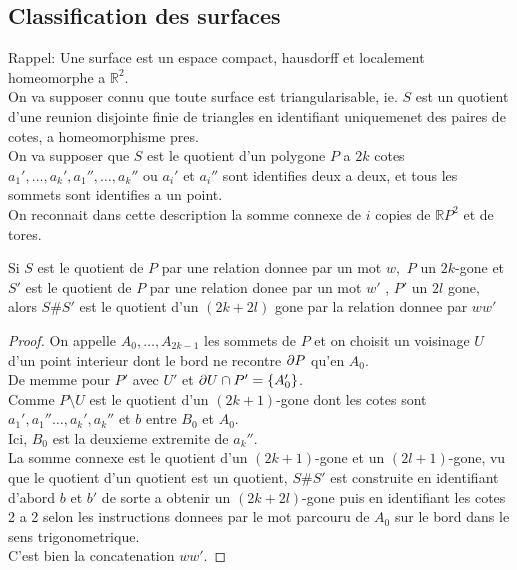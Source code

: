\documentclass[../main.tex]{subfiles}
\begin{document}
\subsection{Classification des surfaces}
Rappel: Une surface est un espace compact, hausdorff et localement homeomorphe a $ \mathbb{R}^{2}$.\\
On va supposer connu que toute surface est triangularisable, ie. $S$ est un quotient d'une reunion disjointe finie de triangles en identifiant uniquemenet des paires de cotes, a homeomorphisme pres.\\
On va supposer que $S$ est le quotient d'un polygone $P$ a $2k$ cotes $ a_1',\ldots,a_k', a_1'', \ldots, a_k''$ ou $a_i'$ et $a_i''$ sont identifies deux a deux, et tous les sommets sont identifies a un point.\\
On reconnait dans cette description la somme connexe de $i$ copies de $ \mathbb{R}P^{2}$ et de tores.
\begin{propo}
Si $S$ est le quotient de $P$ par une relation donnee par un  mot $w,$ $P$ un $2k$-gone et $S'$ est le quotient de $P$ par une relation donee par un mot $ w'$ , $ P'$ un $2l$ gone, alors $S\# S'$ est le quotient d'un $( 2k+2l) $ gone par la relation donnee par $ww'$
\end{propo}
\begin{proof}
On appelle $A_0, \ldots, A_{2k-1} $ les sommets de $P$ et on choisit un voisinage $U$  d'un point interieur dont le bord ne recontre $\partial P$ qu'en $A_0$.\\
De memme pour $P'$ avec $U'$ et $\partial U \cap P' = \left\{ A_0' \right\} $.\\
Comme $ P\setminus  U$  est le quotient d'un $( 2k+1) $-gone dont les cotes sont $a_1', a_1''\ldots, a_k', a_k''$ et $b$ entre $ B_0$ et $A_0$.\\
Ici, $B_0$ est la deuxieme extremite de $a_k''$.\\
La somme connexe est le quotient d'un $( 2k+1) $-gone et un $ ( 2l+1) $-gone, vu que le quotient d'un quotient est un quotient, $ S\# S'$ est construite en identifiant d'abord $b$ et $b'$ de sorte a obtenir un $( 2k+2l) $-gone puis en identifiant les cotes 2 a 2 selon les instructions donnees par le mot parcouru de $A_0$ sur le bord dans le sens trigonometrique.\\
C'est bien la concatenation $ww'$.
\end{proof}

		
\end{document}
